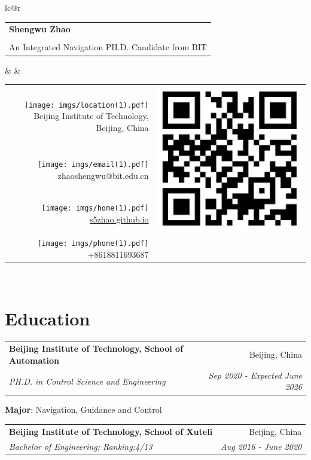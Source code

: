 \documentclass[letterpaper,10pt]{article}
\makeatletter
\newcommand{\resumeItemNoBullet}[2]{
  \item[]\small{
    \hspace{-9pt}\textbf{#1}{: #2 \vspace{-6pt}}
  }
}
\newcommand{\resumeSubheading}[4]{
  \vspace{-1pt}\item[]
  \begin{tabular*}{0.98\textwidth}{l@{\extracolsep{\fill}}r}
      \hspace{-10pt}\textbf{#1} & #2 \\
      \hspace{-10pt}\textit{\small#3} & \textit{\small #4} \\
    \end{tabular*}\vspace{-5pt}
}
\newcommand{\resumeSubHeadingListStart}{\begin{itemize}[leftmargin=*]}
\newcommand{\resumeSubHeadingListEnd}{\end{itemize}}
\newcommand{\shorterSection}[1]{\vspace{-10pt}\section{#1}}
\makeatother
\begin{document}

\begin{table}[]
\begin{tabular*}{\textwidth}{lc@{\extracolsep{\fill}}r}
\begin{tabular}{l}
\textbf{\huge \textcolor{titleblue}{Shengwu Zhao}} \\
\\
An Integrated Navigation PH.D. Candidate from BIT  
\end{tabular}  &  & \begin{tabular}{@{}rr@{}} \textcolor{titleblue}{\texttt{[image: imgs/location(1).pdf]}} Beijing Institute of Technology, Beijing, China & \multirow{3}{*}{\includegraphics[width=0.086\linewidth]{imgs/githubpage.png}} \\
\texttt{[image: imgs/email(1).pdf]}
zhaoshengwu@bit.edu.cn                   &                   \\
\texttt{[image: imgs/home(1).pdf]} \href{https://s5zhao.github.io/}{s5zhao.github.io}                            &                   \\
\texttt{[image: imgs/phone(1).pdf]} +8618811693687                                  &                   
\end{tabular}  \\ 
\end{tabular*}
\end{table}

\vspace*{-10mm}


\shorterSection{\textcolor{titleblue}{Education}}
  \resumeSubHeadingListStart
    \resumeSubheading
      {Beijing Institute of Technology, School of Automation}{Beijing, China}     {PH.D. in Control Science and Engineering}{Sep 2020 - Expected June 2026}{
      \resumeItemNoBullet{Major}{Navigation, Guidance and Control}
    }
    \resumeSubheading
      {Beijing Institute of Technology, School of Xuteli}{Beijing, China}     {Bachelor of  Engineering;  Ranking:4/13}{Aug 2016 - June 2020}
  \resumeSubHeadingListEnd
  
\end{document}

